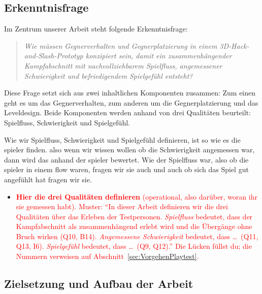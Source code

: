 \documentclass[../Main.tex]{subfiles}
\begin{document}
\subsection{Erkenntnisfrage} \label{sec:Erkenntnisfrage}

Im Zentrum unserer Arbeit steht folgende Erkenntnisfrage:

\vspace{\baselineskip}

\begin{quote}
    \textit{Wie müssen Gegnerverhalten und Gegnerplatzierung in einem 3D-Hack-and-Slash-Prototyp konzipiert sein, damit ein zusammenhängender Kampfabschnitt mit nachvollziehbarem Spielfluss, angemessener Schwierigkeit und befriedigendem Spielgefühl entsteht?}
\end{quote}

\vspace{\baselineskip}

Diese Frage setzt sich aus zwei inhaltlichen Komponenten zusammen: Zum einen geht es um das Gegnerverhalten, zum anderen um die Gegnerplatzierung und das Leveldesign. Beide Komponenten werden anhand von drei Qualitäten beurteilt: Spielfluss, Schwierigkeit und Spielgefühl.

Wie wir Spielfluss, Schwierigkeit und Spielgefühl definieren, ist so wie es die spieler finden. also wenn wir wissen wollen ob die Schwierigkeit angemessen war, dann wird das anhand der spieler bewertet. Wie der Spielfluss war, also ob die spieler in einem flow waren, fragen wir sie auch und auch ob sich das Spiel gut angefühlt hat fragen wir sie.

\begin{itemize}[leftmargin=1.5cm]
    \item \textcolor{red}{\textbf{Hier die drei Qualitäten definieren} (operational, also darüber, woran ihr sie gemessen habt). Muster: \enquote{In dieser Arbeit definieren wir die drei Qualitäten über das Erleben der Testpersonen. \emph{Spielfluss} bedeutet, dass der Kampfabschnitt als zusammenhängend erlebt wird und die Übergänge ohne Bruch wirken (Q10, B14). \emph{Angemessene Schwierigkeit} bedeutet, dass \ldots\ (Q11, Q13, I6). \emph{Spielgefühl} bedeutet, dass \ldots\ (Q9, Q12).} Die Lücken füllst du; die Nummern verweisen auf Abschnitt~\ref{sec:VorgehenPlaytest}.}
\end{itemize}

\subsection{Zielsetzung und Aufbau der Arbeit} \label{sec:Aufbau}
\end{document}
